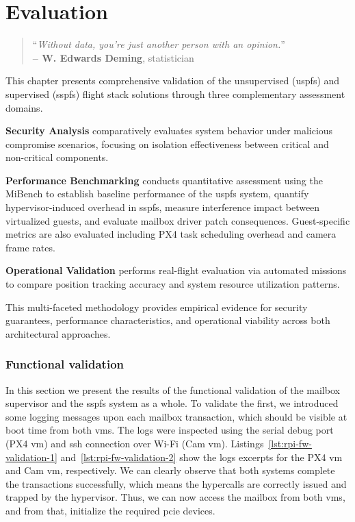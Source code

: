 %
\chapter{Evaluation}
\label{cha:evaluation}
%
\begin{quote}
\begin{flushright}
``\emph{Without data, you're just another person with an opinion.}'' \\
\textbf{-- W. Edwards Deming}, statistician
\end{flushright}
\end{quote}

This chapter presents comprehensive validation of the unsupervised (\gls{uspfs}) and supervised (\gls{sspfs}) flight stack solutions through three complementary assessment domains. 

\textbf{Security Analysis} comparatively evaluates system behavior under malicious compromise scenarios, focusing on isolation effectiveness between critical and non-critical components. 

\textbf{Performance Benchmarking} conducts quantitative assessment using the
MiBench  to establish baseline performance of the \gls{uspfs}
system, quantify hypervisor-induced overhead in \gls{sspfs}, measure
interference impact between virtualized guests, and evaluate mailbox driver
patch consequences. Guest-specific metrics are also evaluated including PX4 task scheduling overhead and camera frame rates.

\textbf{Operational Validation} performs real-flight evaluation via automated missions to compare position tracking accuracy and system resource utilization patterns.

This multi-faceted methodology provides empirical evidence for security
guarantees, performance characteristics, and operational viability across both
architectural approaches.


\subsection{Functional validation}
In this section we present the results of the functional validation of the
mailbox supervisor and the \gls{sspfs} system as a whole. To validate the first,
we introduced some logging messages upon each mailbox transaction, which should
be visible at boot time from both \glspl{vm}. The logs were inspected using the
serial debug port (PX4 \gls{vm}) and \gls{ssh} connection over Wi-Fi (Cam \gls{vm}).
%
Listings~\ref{lst:rpi-fw-validation-1} and~\ref{lst:rpi-fw-validation-2} show
the logs excerpts for the PX4 \gls{vm} and Cam \gls{vm}, respectively. We can
clearly observe that both systems complete the transactions successfully, which
means the hypercalls are correctly issued and trapped by the hypervisor. Thus,
we can now access the mailbox from both \glspl{vm}, and from that, initialize
the required \gls{pcie} devices.

